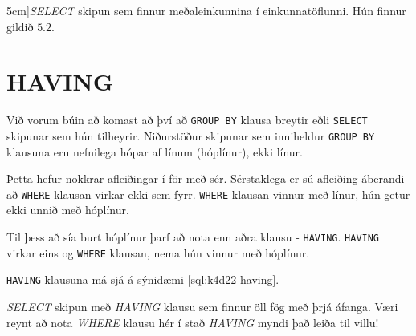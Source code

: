\begin{example}
\vspace{5cm}
\caption[AVG fallið][5cm]{\emph{SELECT} skipun sem finnur meðaleinkunnina í einkunnatöflunni. Hún finnur gildið $5.2$.}
\label{sql:k4d29-avg}
\centering
{}
\end{example}

\section{HAVING}
\label{undirkafli:having}
Við vorum búin að komast að því að \verb|GROUP BY| klausa breytir eðli \verb|SELECT| skipunar sem hún tilheyrir. Niðurstöður skipunar sem inniheldur \verb|GROUP BY| klausuna eru nefnilega hópar af línum (hóplínur), ekki línur.

Þetta hefur nokkrar afleiðingar í för með sér. Sérstaklega er sú afleiðing áberandi að \verb|WHERE| klausan virkar ekki sem fyrr. \verb|WHERE| klausan vinnur með línur, hún getur ekki unnið með hóplínur.

Til þess að sía burt hóplínur þarf að nota enn aðra klausu - \verb|HAVING|. \verb|HAVING| virkar eins og \verb|WHERE| klausan, nema hún vinnur með hóplínur. 

\verb|HAVING| klausuna má sjá á sýnidæmi \ref{sql:k4d22-having}.

\begin{example}
\caption[HAVING]{\emph{SELECT} skipun með \emph{HAVING} klausu sem finnur öll fög með þrjá áfanga. Væri reynt að nota \emph{WHERE} klausu hér í stað \emph{HAVING} myndi það leiða til villu!}
\label{sql:k4d22-having}
\centering
{}
\end{example}

